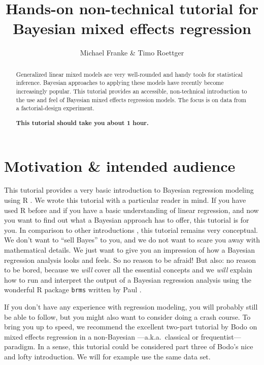 \documentclass[nobib]{tufte-handout}
\title{Hands-on non-technical tutorial for Bayesian mixed effects regression}
\author{Michael Franke \& Timo Roettger}
\date{}
\begin{document}
\maketitle

\begin{abstract}
  \noindent Generalized linear mixed models are very well-rounded and handy tools for statistical inference. Bayesian approaches to applying these models have recently become increasingly popular. This tutorial provides an accessible, non-technical introduction to the use and feel of Bayesian mixed effects regression models. The focus is on data from a factorial-design experiment. \\
  
  \medskip
  
  \noindent \textbf{This tutorial should take you about 1 hour.}
\end{abstract}

\section{Motivation \& intended audience}

This tutorial provides a very basic introduction to Bayesian regression modeling using R \citep{Manual}. We wrote this tutorial with a particular reader in mind. If you have used R before and if you have a basic understanding of linear regression, and now you want to find out what a Bayesian approach has to offer, this tutorial is for you. In comparison to other introductions \citep[e.g.][]{SorensenHohensteinb2016:Bayesian-linear}, this tutorial remains very conceptual. We don’t want to ``sell Bayes'' to you, and we do not want to scare you away with mathematical details. We just want to give you an impression of how a Bayesian regression analysis looks and feels. So no reason to be afraid! But also: no reason to be bored, because we \emph{will} cover all the essential concepts and we \emph{will} explain how to run and interpret the output of a Bayesian regression analysis using the wonderful R package \texttt{brms} written by Paul \citet{buerkner2016brms}.

If you don’t have any experience with regression modeling, you will probably still be able to follow, but you might also want to consider doing a crash course. To bring you up to speed, we recommend the excellent two-part tutorial by Bodo \citet{Winter2013:Linear-models-a} on mixed effects regression in a non-Bayesian ---a.k.a.~classical or frequentist--- paradigm. In a sense, this tutorial could be considered part three of Bodo's nice and lofty introduction. We will for example use the same data set.
\end{document}
